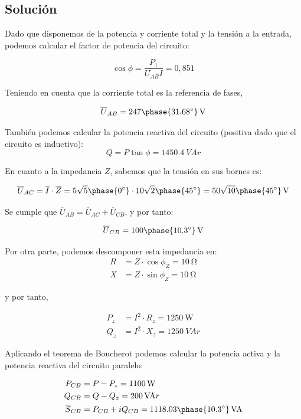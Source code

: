 \subsection*{Solución}

Dado que disponemos de la potencia y corriente total y la tensión a
la entrada, podemos calcular el factor de potencia del circuito:

\[
\cos \phi = \frac{P_1}{U_{AB} I} = 0,851
\]

Teniendo en cuenta que la corriente total es la referencia de fases, 

\[
\overline{U}_{AB} = \qty[parse-numbers=false]{247 \phase{\ang{31.68}}}{\V}
\]

También podemos calcular la potencia reactiva del circuito
(positiva dado que el circuito es inductivo):
\[
Q = P \tan \phi = \qty{1450.4}{VA}r
\]


En cuanto a la impedancia $Z$, sabemos que la tensión en sus bornes
es:

\[
\overline{U}_{AC} = \overline{I} \cdot \overline{Z} =
5\sqrt{5}\phase{\ang{0}} \cdot 10\sqrt{2}\phase{\ang{45}} = \qty[parse-numbers=false]{50\sqrt{10}\phase{\ang{45}}}{\V}
\]

Se cumple que $\overline{U}_{AB} = \overline{U}_{AC} +
\overline{U}_{CB}$, y por tanto:

\[
\overline{U}_{CB} = \qty[parse-numbers=false]{100\phase{\ang{10.3}}}{\V}
\]

Por otra parte, podemos descomponer esta impedancia en:
\begin{align*}
  R &= Z \cdot \cos \phi_Z = \qty{10}{\ohm}\\
  X &= Z \cdot \sin \phi_Z = \qty{10}{\ohm}
\end{align*}

y por tanto,

\begin{align*}
P_z &= I^2 \cdot R_z = \qty{1250}{\watt}\\
Q_z &= I^2 \cdot X_z = \qty{1250}{VA}r
\end{align*}

Aplicando el teorema de Boucherot podemos calcular la potencia activa
y la potencia reactiva del circuito paralelo:

\begin{align*}
P_{CB} &= P - P_z = \qty{1100}{\watt}\\
Q_{CB} &= Q - Q_z = \qty{200}{VA}r\\
\overline{S}_{CB} &= P_{CB} + i Q_{CB} = \qty[parse-numbers=false]{1118.03\phase{\ang{10.3}}}{VA}
\end{align*}

